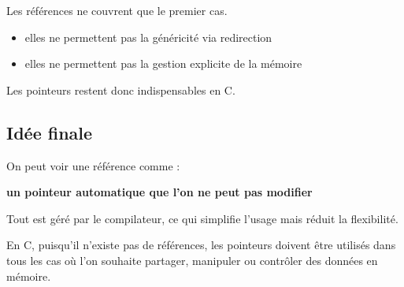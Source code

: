 Les références ne couvrent que le premier cas.

\begin{itemize}
    \item elles ne permettent pas la généricité via redirection
    \item elles ne permettent pas la gestion explicite de la mémoire
\end{itemize}

Les pointeurs restent donc indispensables en C.

\subsection{Idée finale}

On peut voir une référence comme :

\begin{center}
\textbf{un pointeur automatique que l’on ne peut pas modifier}
\end{center}

Tout est géré par le compilateur,
ce qui simplifie l’usage mais réduit la flexibilité.

En C, puisqu’il n’existe pas de références,
les pointeurs doivent être utilisés dans tous les cas
où l’on souhaite partager, manipuler ou contrôler des données en mémoire.
